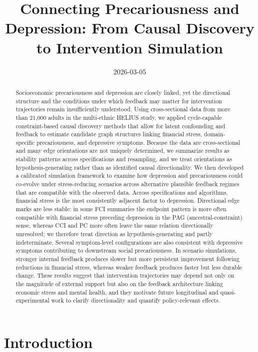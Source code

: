 \documentclass[
]{article}
\title{Connecting Precariousness and Depression: From Causal Discovery
to Intervention Simulation}
\author{%
}
\date{2026-03-05}
\begin{document}
\maketitle
\begin{abstract}
\noindent \textcolor{BrickRed}{Socioeconomic precariousness and depression are closely linked, yet the directional structure and the conditions under which feedback may matter for intervention trajectories remain insufficiently understood. Using cross-sectional data from more than 21,000 adults in the multi-ethnic HELIUS study, we applied cycle-capable constraint-based causal discovery methods that allow for latent confounding and feedback to estimate candidate graph structures linking financial stress, domain-specific precariousness, and depressive symptoms. Because the data are cross-sectional and many edge orientations are not uniquely determined, we summarize results as stability patterns across specifications and resampling, and we treat orientations as hypothesis-generating rather than as identified causal directionality. We then developed a calibrated simulation framework to examine how depression and precariousness could co-evolve under stress-reducing scenarios across alternative plausible feedback regimes that are compatible with the observed data. Across specifications and algorithms, financial stress is the most consistently adjacent factor to depression. Directional edge marks are less stable: in some FCI summaries the endpoint pattern is more often compatible with financial stress preceding depression in the PAG (ancestral-constraint) sense, whereas CCI and PC more often leave the same relation directionally unresolved; we therefore treat direction as hypothesis-generating and partly indeterminate. Several symptom-level configurations are also consistent with depressive symptoms contributing to downstream social precariousness. In scenario simulations, stronger internal feedback produces slower but more persistent improvement following reductions in financial stress, whereas weaker feedback produces faster but less durable change. These results suggest that intervention trajectories may depend not only on the magnitude of external support but also on the feedback architecture linking economic stress and mental health, and they motivate future longitudinal and quasi-experimental work to clarify directionality and quantify policy-relevant effects.}
\end{abstract}


\section{Introduction}\label{introduction}
\end{document}
